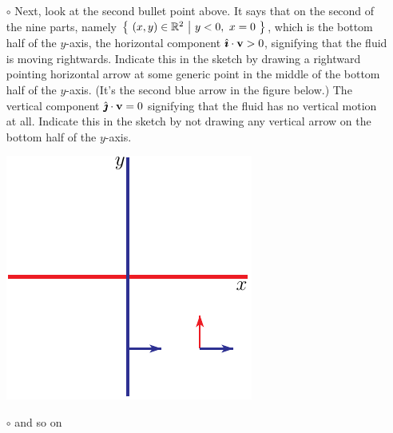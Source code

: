 \begin{eg}
\begin{itemize}
\item[$\circ$]
Next, look at the second bullet point above. It says that on the second of the nine parts, namely $\big\{\ (x,y)\in\bbbr^2\ \big|\  y<0,\ x=0\ \big\}$,
which is the bottom half of the $y$-axis, 
the horizontal component  $\hat{\pmb{\imath}}\cdot\mathbf{v}>0$, signifying that the fluid is moving
rightwards. Indicate this in the sketch by drawing a rightward pointing 
horizontal arrow at some generic point in the middle of the bottom half 
of the $y$-axis. (It's the second blue arrow in the figure below.) 
The vertical component  $\hat{\pmb{\jmath}}\cdot\mathbf{v}=0$ signifying that the fluid has
no vertical motion at all. Indicate this in the sketch by not drawing any 
vertical arrow on the bottom half of the $y$-axis.
\begin{efig}
\begin{center}
    \includegraphics{phaseVortex5.pdf}
\end{center}
\end{efig}


\item[$\circ$]
and so on


\end{itemize}
\end{eg}
